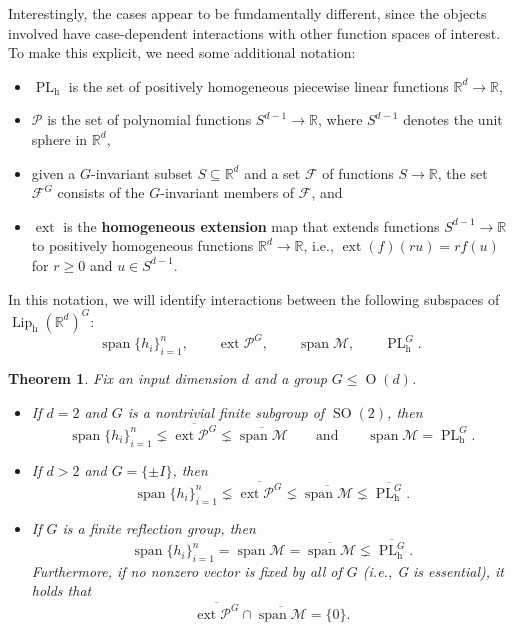 \documentclass{article}
\theoremstyle{plain}
\newtheorem{theorem}{Theorem}
\theoremstyle{definition}
\begin{document}
Interestingly, the cases appear to be fundamentally different, since the objects involved have case-dependent interactions with other function spaces of interest.
To make this explicit, we need some additional notation:
\begin{itemize}
\item
$\operatorname{PL}_{\operatorname{h}}$ is the set of positively homogeneous piecewise linear functions $\mathbb{R}^d\to\mathbb{R}$,
\item
$\mathcal{P}$ is the set of polynomial functions $S^{d-1}\to\mathbb{R}$, where $S^{d-1}$ denotes the unit sphere in $\mathbb{R}^d$,
\item
given a $G$-invariant subset $S\subseteq\mathbb{R}^d$ and a set $\mathcal{F}$ of functions $S\to\mathbb{R}$, the set $\mathcal{F}^G$ consists of the $G$-invariant members of $\mathcal{F}$, and
\item
$\operatorname{ext}$ is the \textbf{homogeneous extension} map that extends functions $S^{d-1}\to\mathbb{R}$ to positively homogeneous functions $\mathbb{R}^d\to\mathbb{R}$, i.e., $\operatorname{ext}(f)(ru)=rf(u)$ for $r\geq0$ and $u\in S^{d-1}$.
\end{itemize}
In this notation, we will identify interactions between the following subspaces of $\operatorname{Lip}_{\operatorname{h}}(\mathbb{R}^d)^G$:
\[
\operatorname{span}\{h_i\}_{i=1}^n,
\qquad
\operatorname{ext}\mathcal{P}^G,
\qquad \operatorname{span}\mathcal{M},
\qquad \operatorname{PL}_{\operatorname{h}}^G.
\]

\begin{theorem}
\label{thm.main result ii}
Fix an input dimension $d$ and a group $G\leq\operatorname{O}(d)$.
\begin{itemize}
\item[(a)] 
If $d=2$ and $G$ is a nontrivial finite subgroup of $\operatorname{SO}(2)$, then
\[
\operatorname{span}\{h_i\}_{i=1}^n
\lneq \overline{\operatorname{ext}\mathcal{P}^G}
\lneq \overline{\operatorname{span}\mathcal{M}}
\qquad
\text{and}
\qquad
\operatorname{span}\mathcal{M}
=\operatorname{PL}_{\operatorname{h}}^G\text{.}
\]
\item[(b)]
If $d>2$ and $G=\{\pm I\}$, then 
\[
\operatorname{span}\{h_i\}_{i=1}^n
\lneq \overline{\operatorname{ext}\mathcal{P}^G}
\lneq \overline{\operatorname{span}\mathcal{M}}
\lneq \overline{\operatorname{PL}_{\operatorname{h}}^G}\text{.}
\]
\item[(c)]
If $G$ is a finite reflection group, then
\[
\operatorname{span}\{h_i\}_{i=1}^n
=\operatorname{span}\mathcal{M}
=\overline{\operatorname{span}\mathcal{M}}
\lneq \overline{\operatorname{PL}_{\operatorname{h}}^G}.
\]
Furthermore, if no nonzero vector is fixed by all of $G$ (i.e., G is essential), it holds that
\[
\overline{\operatorname{ext}\mathcal{P}^G}\cap\overline{\operatorname{span}\mathcal{M}}=\{0\}\text{.}
\]
\end{itemize}
\end{theorem}
\end{document}
